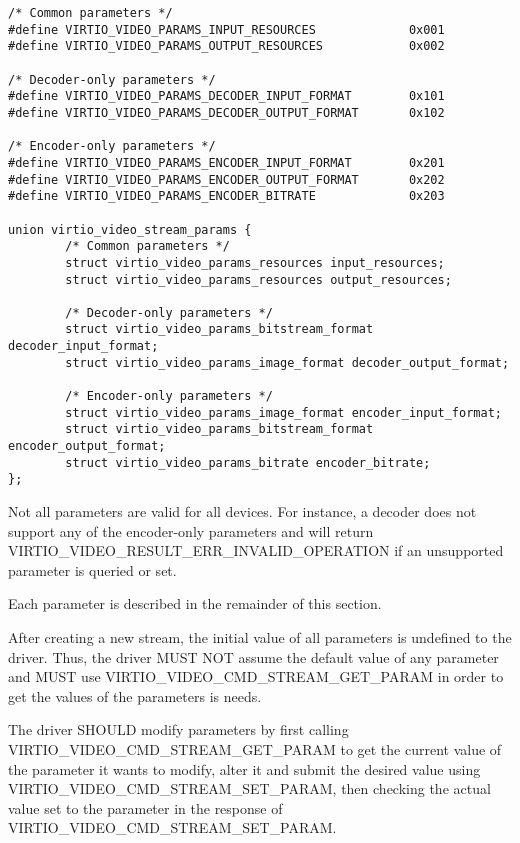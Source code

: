 \begin{lstlisting}
/* Common parameters */
#define VIRTIO_VIDEO_PARAMS_INPUT_RESOURCES             0x001
#define VIRTIO_VIDEO_PARAMS_OUTPUT_RESOURCES            0x002

/* Decoder-only parameters */
#define VIRTIO_VIDEO_PARAMS_DECODER_INPUT_FORMAT        0x101
#define VIRTIO_VIDEO_PARAMS_DECODER_OUTPUT_FORMAT       0x102

/* Encoder-only parameters */
#define VIRTIO_VIDEO_PARAMS_ENCODER_INPUT_FORMAT        0x201
#define VIRTIO_VIDEO_PARAMS_ENCODER_OUTPUT_FORMAT       0x202
#define VIRTIO_VIDEO_PARAMS_ENCODER_BITRATE             0x203

union virtio_video_stream_params {
        /* Common parameters */
        struct virtio_video_params_resources input_resources;
        struct virtio_video_params_resources output_resources;

        /* Decoder-only parameters */
        struct virtio_video_params_bitstream_format decoder_input_format;
        struct virtio_video_params_image_format decoder_output_format;

        /* Encoder-only parameters */
        struct virtio_video_params_image_format encoder_input_format;
        struct virtio_video_params_bitstream_format encoder_output_format;
        struct virtio_video_params_bitrate encoder_bitrate;
};
\end{lstlisting}

Not all parameters are valid for all devices. For instance, a decoder
does not support any of the encoder-only parameters and will return
VIRTIO_VIDEO_RESULT_ERR_INVALID_OPERATION if an unsupported
parameter is queried or set.

Each parameter is described in the remainder of this section.


After creating a new stream, the initial value of all parameters is
undefined to the driver. Thus, the driver MUST NOT assume the default
value of any parameter and MUST use
VIRTIO_VIDEO_CMD_STREAM_GET_PARAM in order to get the values of the
parameters is needs.

The driver SHOULD modify parameters by first calling
VIRTIO_VIDEO_CMD_STREAM_GET_PARAM to get the current value of the
parameter it wants to modify, alter it and submit the desired value
using VIRTIO_VIDEO_CMD_STREAM_SET_PARAM, then checking the actual
value set to the parameter in the response of
VIRTIO_VIDEO_CMD_STREAM_SET_PARAM.


